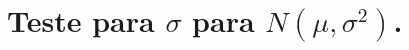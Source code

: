 \documentclass[8pt]{beamer}
\begin{document}
%
%
%
%
%
%
%
%	
%
%
%
\section{Teste para $\sigma$ para $N(\mu, \sigma^2)$.}
\end{document}
